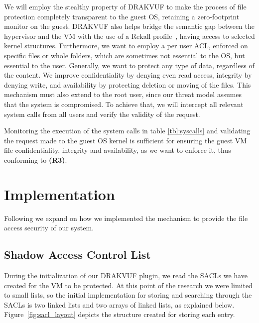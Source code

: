 \par We will employ the stealthy property of DRAKVUF to make the process of file protection completely transparent to the guest \ac{OS}, retaining a zero-footprint monitor on the guest. DRAKVUF also helps bridge the semantic gap between the hypervisor and the \ac{VM} with the use of a Rekall profile~\cite{rekall}, having access to selected kernel structures. Furthermore, we want to employ a per user \ac{ACL}, enforced on specific files or whole folders, which are sometimes not essential to the \ac{OS}, but essential to the user. Generally, we want to protect any type of data, regardless of the content. We improve confidentiality by denying even read access, integrity by denying write, and availability by protecting deletion or moving of the files. This mechanism must also extend to the root user, since our threat model assumes that the system is compromised. To achieve that, we will intercept all relevant system calls from all users and verify the validity of the request. 

\par Monitoring the execution of the system calls in table \ref{tbl:syscalls} and validating the request made to the guest \ac{OS} kernel is sufficient for ensuring the guest \ac{VM} file confidentiality, integrity and availability, as we want to enforce it, thus conforming to \textbf{(R3)}.


\section{Implementation}\label{sec:implementation}

\par Following we expand on how we implemented the mechanism to provide the file access security of our system.



\subsection{Shadow Access Control List}\label{sub:sacl}
During the initialization of our DRAKVUF plugin, we read the \ac{SACL}s we have created for the \ac{VM} to be protected. At this point of the research we were limited to small lists, so the initial implementation for storing and searching through the \ac{SACL}s is two linked lists and two arrays of linked lists, as explained below. Figure~\ref{fig:sacl_layout} depicts the structure created for storing each entry.

